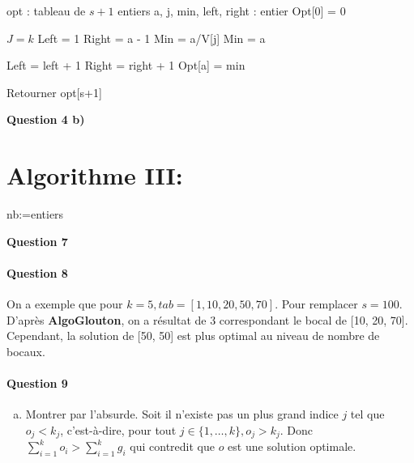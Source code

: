 \documentclass{article}
\begin{document}
\begin{algorithm}[!h]
\SetAlgoLined{}
        opt : tableau de $s+1$ entiers\;
        a, j, min, left, right : entier\;
        Opt[0] = 0\;
                {{$J = k$\;}
                Left = 1\;
                Right = a - 1\;
                        {Min = a/V[j]}
                     {Min = a}
              
                      {
                        Left = left + 1\;
                        Right = right + 1\;}          
                Opt[a] = min\;}
        Retourner opt[s+1]\;
        \caption{\textbf{Question 4 b)}}
\end{algorithm}

\newpage
\section{Algorithme III:}

\begin{algorithm}[!h]
\SetAlgoLined{}
  nb:=entiers\;
    \caption{\textbf{Question 7}}
 \end{algorithm}
  
\paragraph{Question 8}
On a exemple que pour $k=5, tab = [1, 10, 20, 50, 70]$. Pour remplacer $s=100$. D'après \textbf{AlgoGlouton}, on a résultat de 3 correspondant le bocal de [10, 20, 70]. Cependant, la solution de [50, 50] est plus optimal au niveau de nombre de bocaux.
\paragraph{Question 9}
\begin{enumerate}[a)]
\item Montrer par l'absurde. Soit il n'existe pas un plus grand indice $j$ tel que $o_j < k_j$, c'est-à-dire, pour tout $j \in \{1, \dots, k\}, o_j > k_j$. Donc $\sum_{i=1}^{k}o_i > \sum_{i=1}^{k}g_i$ qui contredit que $o$ est une solution optimale.
\end{enumerate}
\end{document}
